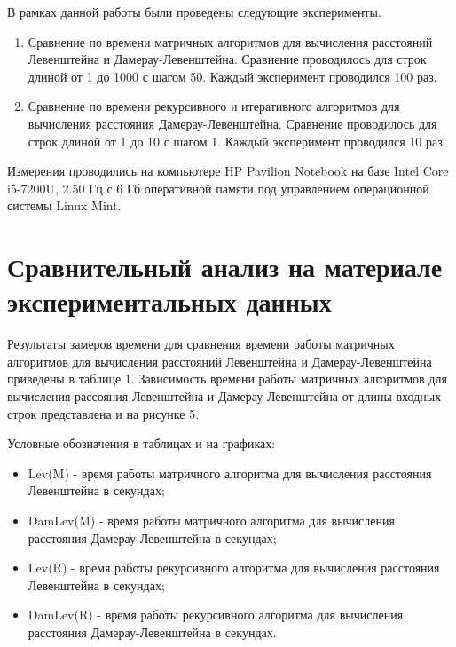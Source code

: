 \documentclass[14pt]{report}
\begin{document}
В рамках данной работы были проведены следующие эксперименты.
\begin{enumerate}
	\item Сравнение по времени матричных алгоритмов для вычисления расстояний Левенштейна и Дамерау-Левенштейна. Сравнение проводилось для строк длиной от 1 до 1000 с шагом 50. Каждый эксперимент проводился 100 раз.
	\item Сравнение по времени рекурсивного и итеративного алгоритмов для вычисления расстояния Дамерау-Левенштейна. Сравнение проводилось для строк длиной от 1 до 10 с шагом 1. Каждый эксперимент проводился 10 раз.
\end{enumerate}

Измерения проводились на компьютере HP Pavilion Notebook на базе Intel Core i5-7200U, 2.50 Гц с 6 Гб оперативной памяти под управлением операционной системы Linux Mint.

\section*{Сравнительный анализ на материале экспериментальных данных}

Результаты замеров времени для сравнения времени работы матричных алгоритмов для вычисления расстояний Левенштейна и Дамерау-Левенштейна приведены в таблице 1. Зависимость времени работы матричных алгоритмов для вычисления рассояния Левенштейна и Дамерау-Левенштейна от длины входных строк представлена и на рисунке 5.

Условные обозначения в таблицах и на графиках:
\begin{itemize}
	\item Lev(M) - время работы матричного алгоритма для вычисления расстояния Левенштейна в секундах;
	\item DamLev(M) - время работы матричного алгоритма для вычисления расстояния Дамерау-Левенштейна в секундах;
	\item Lev(R) - время работы рекурсивного алгоритма для вычисления расстояния Левенштейна в секундах;
	\item DamLev(R) - время работы рекурсивного алгоритма для вычисления расстояния Дамерау-Левенштейна в секундах.
\end{itemize}
\end{document}
